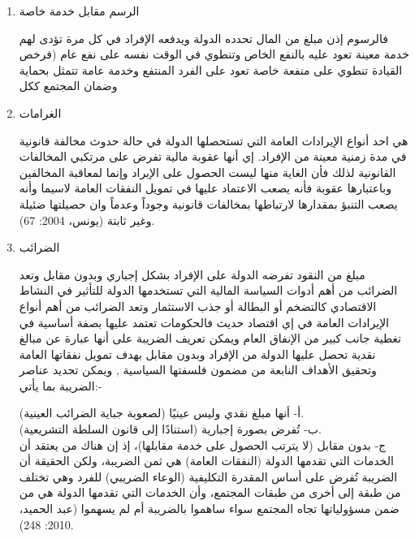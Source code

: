 \documentclass[10pt,a4paper]{report}
\begin{document}
\begin{doublespacing}
\begin{enumerate}
	     هي مبالغ نقدية يدفعها الإفراد للدولة مقابل الحصول على خدمة خاصة يحصل عليها من جراء معاملة ما , ويعد الرسم مصدراً آخر من مصادر الإيرادات العامة في الدولة وان كانت أهميته لاتصل لأهمية الإيرادات العامة الأخرى (العلي, 2012: 105). وقد كان سابقاً لا يحتاج إلى موافقة السلطة التشريعية إي قد تعطى صلاحية لمدير الدائرة بتحديد الرسم ضمن حدود دائرته.
	     عن طريق التعريف المذكور آنفا" يمكن تحديد عناصر الرسم بالآتي :
	     	     \begin{itemize}
\item الصفة النقدية  
\item الصفة الإجبارية
	     \end{itemize}
	     \item الرسم مقابل خدمة خاصة
	     
	          فالرسوم إذن مبلغ من المال تحدده الدولة ويدفعه الإفراد في كل مرة تؤدى لهم خدمة معينة تعود عليه بالنفع الخاص وتنطوي في الوقت نفسه على نفع عام (فرخص القيادة تنطوي على منفعة خاصة تعود على الفرد المنتفع وخدمة عامة تتمثل بحماية وضمان المجتمع ككل   
\item الغرامات

هي احد أنواع الإيرادات العامة التي تستحصلها الدولة في حالة حدوث مخالفة قانونية في مدة زمنية معينة من الإفراد. إي أنها عقوبة مالية تفرض على مرتكبي المخالفات القانونية لذلك فأن الغاية منها ليست الحصول على الإيراد وإنما لمعاقبة المخالفين وباعتبارها عقوبة فأنه يصعب الاعتماد عليها في تمويل النفقات العامة لاسيما وأنه يصعب التنبؤ بمقدارها لارتباطها بمخالفات قانونية وجوداً وعدماً وان حصيلتها ضئيلة وغير ثابتة (يونس، 2004: 67).
\item الضرائب

     مبلغ من النقود تفرضه الدولة على الإفراد بشكل إجباري وبدون مقابل وتعد الضرائب من أهم أدوات السياسة المالية التي تستخدمها الدولة للتأثير في النشاط الاقتصادي كالتضخم أو البطالة أو جذب الاستثمار وتعد الضرائب من أهم أنواع الإيرادات العامة في إي اقتصاد حديث فالحكومات تعتمد عليها بصفة أساسية في تغطية جانب كبير من الإنفاق العام ويمكن تعريف الضريبة على أنها عبارة عن مبالغ نقدية تحصل عليها الدولة من الإفراد وبدون مقابل بهدف تمويل نفقاتها العامة وتحقيق الأهداف النابعة من مضمون فلسفتها السياسية , ويمكن تحديد عناصر الضريبة بما يأتي:-
    
\noindent أ- أنها مبلغ نقدي وليس عينيًا (لصعوبة جباية الضرائب العينية).\\
ب- تُفرض بصورة إجبارية (استنادًا إلى قانون السلطة التشريعية).\\
ج- بدون مقابل (لا يترتب الحصول على خدمة مقابلها)، إذ إن هناك من يعتقد أن الخدمات التي تقدمها الدولة (النفقات العامة) هي ثمن الضريبة، ولكن الحقيقة أن الضريبة تُفرض على أساس المقدرة التكليفية (الوعاء الضريبي) للفرد وهي تختلف من طبقة إلى أخرى من طبقات المجتمع، وأن الخدمات التي تقدمها الدولة هي من ضمن مسؤولياتها تجاه المجتمع سواء ساهموا بالضريبة أم لم يسهموا (عبد الحميد، 2010: 248).


\end{enumerate}
\end{doublespacing}
\end{document}
